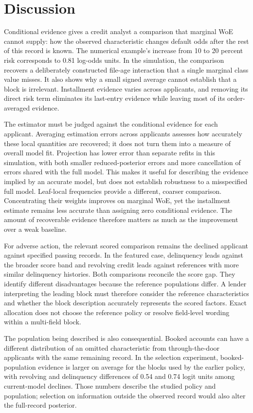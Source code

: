 \section{Discussion}\label{sec:discussion}

Conditional evidence gives a credit analyst a comparison that marginal WoE cannot supply: how the observed characteristic changes default odds after the rest of this record is known. The numerical example's increase from 10 to 20 percent risk corresponds to 0.81 log-odds units. In the simulation, the comparison recovers a deliberately constructed file-age interaction that a single marginal class value misses. It also shows why a small signed average cannot establish that a block is irrelevant. Installment evidence varies across applicants, and removing its direct risk term eliminates its last-entry evidence while leaving most of its order-averaged evidence.

The estimator must be judged against the conditional evidence for each applicant. Averaging estimation errors across applicants assesses how accurately these local quantities are recovered; it does not turn them into a measure of overall model fit. Projection has lower error than separate refits in this simulation, with both smaller reduced-posterior errors and more cancellation of errors shared with the full model. This makes it useful for describing the evidence implied by an accurate model, but does not establish robustness to a misspecified full model. Leaf-local frequencies provide a different, coarser comparison. Concentrating their weights improves on marginal WoE, yet the installment estimate remains less accurate than assigning zero conditional evidence. The amount of recoverable evidence therefore matters as much as the improvement over a weak baseline.

For adverse action, the relevant scored comparison remains the declined applicant against specified passing records. In the featured case, delinquency leads against the broader score band and revolving credit leads against references with more similar delinquency histories. Both comparisons reconcile the score gap. They identify different disadvantages because the reference populations differ. A lender interpreting the leading block must therefore consider the reference characteristics and whether the block description accurately represents the scored factors. Exact allocation does not choose the reference policy or resolve field-level wording within a multi-field block.

The population being described is also consequential. Booked accounts can have a different distribution of an omitted characteristic from through-the-door applicants with the same remaining record. In the selection experiment, booked-population evidence is larger on average for the blocks used by the earlier policy, with revolving and delinquency differences of 0.54 and 0.74 logit units among current-model declines. Those numbers describe the studied policy and population; selection on information outside the observed record would also alter the full-record posterior.

